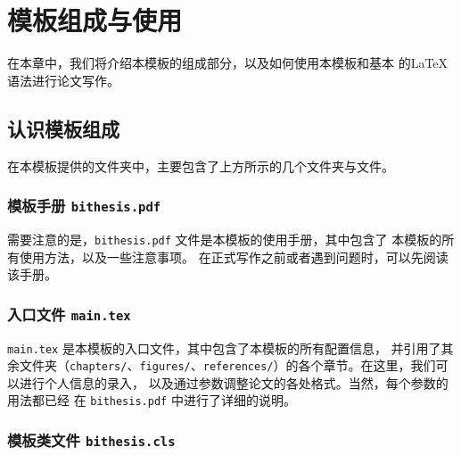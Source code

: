 \chapter{模板组成与使用}
\label{sec:using-bithesis}

在本章中，我们将介绍本模板的组成部分，以及如何使用本模板和基本
的\LaTeX 语法进行论文写作。


\section{认识模板组成}


在本模板提供的文件夹中，主要包含了上方所示的几个文件夹与文件。

\subsection{模板手册 \texttt{bithesis.pdf}}

需要注意的是，\texttt{bithesis.pdf} 文件是本模板的使用手册，其中包含了
本模板的所有使用方法，以及一些注意事项。
在正式写作之前或者遇到问题时，可以先阅读该手册。

\subsection{入口文件 \texttt{main.tex}}

\texttt{main.tex} 是本模板的入口文件，其中包含了本模板的所有配置信息，
并引用了其余文件夹（\texttt{chapters/}、\texttt{figures/}、\texttt{references/}）的各个章节。在这里，我们可以进行个人信息的录入，
以及通过参数调整论文的各处格式。当然，每个参数的用法都已经
在 \texttt{bithesis.pdf} 中进行了详细的说明。

\subsection{模板类文件 \texttt{bithesis.cls}}

